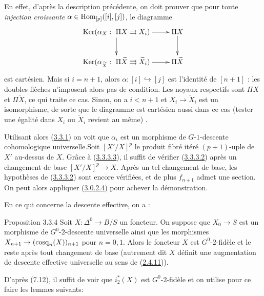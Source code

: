 \documentclass[10pt]{../fichiers-configuration-latex/smfart}
\begin{document}
En effet, d'après la description précédente, on doit
prouver que pour toute \textit{injection croissante}
$\alpha\in\operatorname{Hom}_{[p]}([i],[j])$, le diagramme
$$\xymatrix{\Ker(\alpha_X:\ \Pi X\rightrightarrows X_i)\ar[r]\ar[d]&\Pi X\ar[d]\\
\Ker(\alpha_{{\tilde X}}:\ \Pi {\tilde X}\rightrightarrows {\tilde
X}_i)\ar[r]&\Pi {\tilde X}}$$ est cartésien. Mais si $i=n+1$,
alors $\alpha: [i]\hookrightarrow [j] $ est l'identité de
$[n+1]$ : les doubles flèches n'imposent alors pas de condition.
Les noyaux respectifs sont $\Pi X$ et $\Pi {\tilde X}$, ce qui
traite ce cas. Sinon, on a $i<n+1$ et $X_i\rightarrow {\tilde X}_i$ est un
isomorphisme, de sorte que le diagramme est cartésien aussi dans
ce cas (tester une égalité dans $X_i$ ou ${\tilde X}_i$
revient au même) .


Utilisant alors (\hyperref[Vbis.prop3.3.1]{3.3.1}) on voit que $\alpha_\iota$ est
un morphisme de $G$-$1$-descente cohomologique universelle.Soit $[X'/X]^p$ le produit fibré itéré $(p+1)$-uple de $X'$
au-dessus de $X$. Grâce à (\hyperref[Vbis.lem3.3.3.3]{3.3.3.3}), il suffit de
vérifier (\hyperref[Vbis.lem3.3.3.2]{3.3.3.2}) après un changement de base
$[X'/X]^p \to X$. Après un tel changement de base, les hypothèses de
(\hyperref[Vbis.lem3.3.3.2]{3.3.3.2}) sont encore vérifiées, et de plus $f_{n+1}$
admet une section. On peut alors appliquer (\hyperref[Vbis.lem3.0.2.4]{3.0.2.4})
pour achever la démonstration.

En ce qui concerne la descente effective, on a :

\begin{enonce*}{Proposition 3.3.4}
Soit $X : \Delta^0 \to B/S$ un foncteur. On suppose que $X_0 \to S$
est un morphisme de $G^0$-$2$-descente universelle ainsi que les
morphismes $X_{n+1} \to (\cosk_n (X))_{n+1}$ pour $n = 0, 1$. Alors
le foncteur $X$ est $G^0$-$2$-fidèle et le reste après tout changement
de base (autrement dit $X$ définit une augmentation de descente
effective universelle au sens de (\hyperref[Vbis.def2.4.11]{2.4.11})).
\end{enonce*}

D'après \cite{SGA4-05bis:4} (7.12), il suffit de voir que $i^{\ast}_2(X)$ est
$G^0$-$2$-fidèle et on utilise pour ce faire les lemmes suivants:
\end{document}

